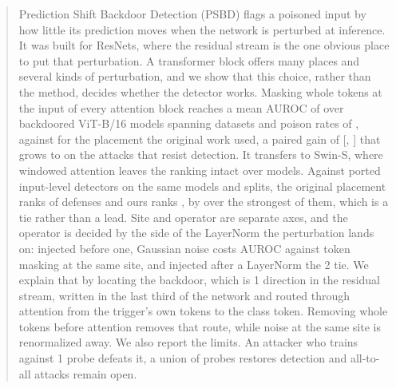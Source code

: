 \begin{abstract}
Prediction Shift Backdoor Detection (PSBD) flags a poisoned input by how little its
prediction moves when the network is perturbed at inference. It was built for ResNets,
where the residual stream is the one obvious place to put that perturbation. A
transformer block offers many places and several kinds of perturbation, and we show that
this choice, rather than the method, decides whether the detector works. Masking whole
tokens at the input of every attention block reaches a mean AUROC of
\HeadlineAurocAdaptive{} over \PanelCellsCached{} backdoored ViT-B/16 models spanning
\PanelDatasetsCached{} datasets and poison rates of \PanelRates{}, against
\PublishedAurocAdaptive{} for the placement the original work used, a paired gain of
\HeadlineGainAdaptiveAuroc{} [\HeadlineGainAdaptiveAurocLow{},
\HeadlineGainAdaptiveAurocHigh{}] that grows to \HardGainAdaptiveAuroc{} on the attacks
that resist detection. It transfers to Swin-S, where windowed attention leaves the
ranking intact over \SwinCells{} models. Against \DetectorsComparedCount{} ported
input-level detectors on the same models and splits, the original placement ranks
\DetectorsAurocRankPublished{} of \DetectorsAurocDefensesRanked{} defenses and ours
ranks \DetectorsAurocRankOurs{}, by \DetectorsAurocMargin{} over the strongest of
them, which is a tie rather than a lead. Site and operator are separate axes, and the operator is decided by
the side of the LayerNorm the perturbation lands on: injected before one, Gaussian noise
costs \StaircaseOperatorsBeforeAttentionNormGaussianGain{} AUROC against token masking
at the same site, and injected after a LayerNorm the 2 tie. We explain that by locating the
backdoor, which is 1 direction in the residual stream, written in the last third of the
network and routed through attention from the trigger's own tokens to the class token.
Removing whole tokens before attention removes that route, while noise at the same site
is renormalized away. We also report the limits. An attacker who trains against 1 probe
defeats it, a union of probes restores detection and all-to-all attacks remain open.
\end{abstract}
